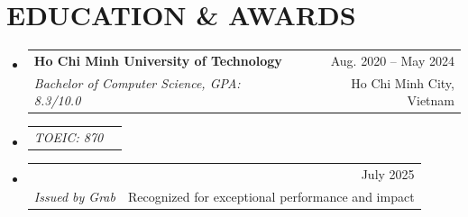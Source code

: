 \documentclass[letterpaper,11pt]{article}
\makeatletter
\newcommand{\myuline}[1]{%
  \uline{\phantom{#1}}%
  \llap{\contour{white}{#1}}%
}
\newcommand{\resumeSubheading}[4]{
  \vspace{-2pt}
\item
  \begin{tabular*}{\textwidth}[t]{l@{\extracolsep{\fill}}r}
    \textbf{#1} & {\color{dark-grey}\small #2}\vspace{1pt}\\ %
    \textit{#3} & {\color{dark-grey} \small #4}\\ %
  \end{tabular*}\vspace{-5pt}
}
\newcommand{\resumeSubSubheading}[2]{
\item
  \begin{tabular*}{\textwidth}{l@{\extracolsep{\fill}}r}
    \textit{\small#1} & \textit{\small #2} \\
  \end{tabular*}\vspace{-7pt}
}
\newcommand{\resumeSubHeadingListStart}{
\begin{itemize}[leftmargin=0in, label={}]}
\newcommand{\resumeSubHeadingListEnd}{
  \end{itemize}}
\makeatother
\begin{document}

\section{EDUCATION \& AWARDS}
\resumeSubHeadingListStart
\resumeSubheading
{Ho Chi Minh University of Technology}{Aug. 2020 -- May 2024}
{Bachelor of Computer Science, GPA: 8.3/10.0}{Ho Chi Minh City, Vietnam}
\resumeSubSubheading
{TOEIC: 870}{}
\resumeSubheading
{\href{https://sites.google.com/grabtaxi.com/tech-infra-appreciation-board/appreciation-board/july}{\myuline{First Grab Rising Star Award}}}{July 2025}
{Issued by Grab}{Recognized for exceptional performance and impact}
\resumeSubHeadingListEnd

\end{document}
